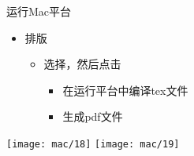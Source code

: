 \documentclass[fontset = none, t]{ctexbeamer}
\begin{document}
\begin{frame}{运行\tl}{Mac平台}
  \begin{spacing}{1.5}
    \begin{itemize}
    \item 排版
        \begin{itemize}
        \item 选择，然后点击
          \begin{itemize}
          \item 在运行平台中编译tex文件
          \item 生成pdf文件
          \end{itemize}  
        \end{itemize}
    \end{itemize}
    \begin{center}
      \texttt{[image: mac/18]}
      \texttt{[image: mac/19]}
    \end{center}
  \end{spacing}         
\end{frame}
\end{document}

